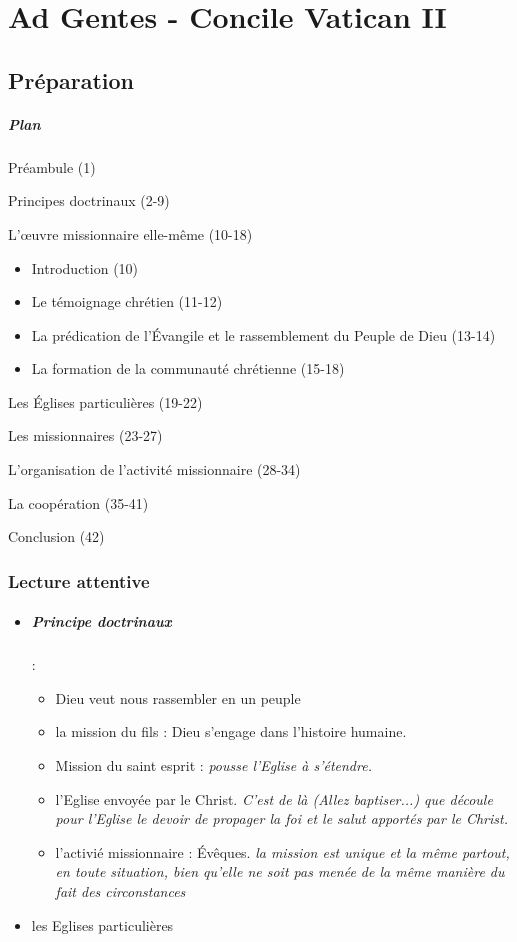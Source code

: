 \chapter{Ad Gentes - Concile Vatican II}


\section{Préparation}
\paragraph{Plan}
Préambule (1)

Principes doctrinaux (2-9)

L’œuvre missionnaire elle-même (10-18)
\begin{itemize}
    \item Introduction (10)
  \item Le témoignage chrétien (11-12)
  \item La prédication de l’Évangile et le rassemblement du Peuple de Dieu (13-14)
  \item La formation de la communauté chrétienne (15-18)
\end{itemize}
 
Les Églises particulières (19-22)

Les missionnaires (23-27)

L’organisation de l’activité missionnaire (28-34)

La coopération (35-41)

Conclusion (42)

\subsection{Lecture attentive}
\begin{itemize}
    \item \paragraph{Principe doctrinaux} : 
    \begin{itemize}
        \item  Dieu veut nous rassembler en un peuple
        \item la mission du fils : Dieu s'engage dans l'histoire humaine.
        \item Mission du saint esprit : \textit{pousse l'Eglise à s'étendre. }
        \item l'Eglise envoyée par le Christ.  \textit{C'est de là (Allez baptiser...) que découle pour l'Eglise le devoir de propager la foi et le salut apportés par le Christ. } 
        \item l'activié missionnaire : Évêques.  \textit{la mission est unique et la même partout, en toute situation, bien qu'elle ne soit pas menée de la même manière du fait des circonstances}
    \end{itemize}
   \item les Eglises particulières
    
\end{itemize}

